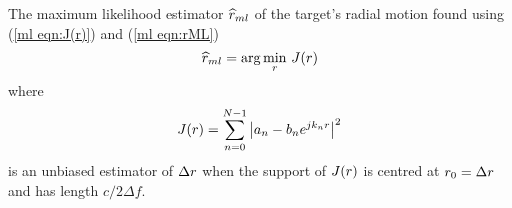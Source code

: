 \begin{theorem}
The maximum likelihood estimator $\widehat{r}_{ml}$ of the target's radial motion found
using (\ref{ml eqn:J(r)}) and (\ref{ml eqn:rML})
\begin{equation}
\widehat{r}_{ml}=\arg\min_{{r}}\,J({r})
\end{equation}
where
\begin{equation}\label{sp eqn:J(r)}
J({r})=\sum_{n=0}^{N-1} \left|a_n-b_n{e^{jk_n{r}}}\right|^2
\end{equation}
is an unbiased estimator of ${\Delta r}$ when the support of $J({r})$ is
centred at ${r}_0={\Delta r}$ and has length $c/2\Delta f$.
\end{theorem}

